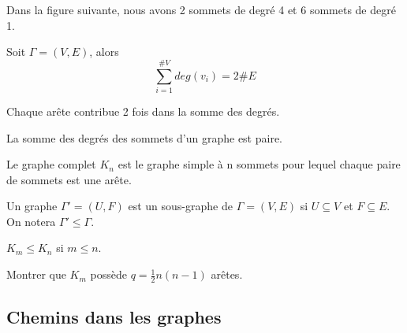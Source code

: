 \begin{exmp}
Dans la figure suivante, nous avons 2 sommets de degré 4 et 6 sommets de degré 1.
\end{exmp}



\begin{thrm}
Soit $\Gamma = (V,E)$, alors $$\sum_{i=1}^{\#V} deg(v_{i}) = 2\#E$$
\end{thrm}

\begin{demo}
Chaque arête contribue 2 fois dans la somme des degrés.
\end{demo}

\begin{corll}
La somme des degrés des sommets d'un graphe est paire. \\
\end{corll}

\newpage

\begin{defn}
Le graphe complet $K_{n}$ est le graphe simple à n sommets pour lequel chaque paire de sommets est une arête.
\end{defn}

\begin{exmp}
	
\end{exmp}

\begin{defn}
Un graphe ${\Gamma}'=(U,F)$ est un sous-graphe de $\Gamma=(V,E)$ si $ U \subseteq V$ et $F \subseteq E$. On notera $ {\Gamma}' \leq \Gamma$.
\end{defn}

\begin{exmp}
$ K_{m} \leq K_{n}$ si $ m \leq n$.
\end{exmp}

\begin{exo}
Montrer que $K_{m}$ possède $ q=\frac{1}{2}n(n-1)$ arêtes.
\end{exo}


\subsection{Chemins dans les graphes}

